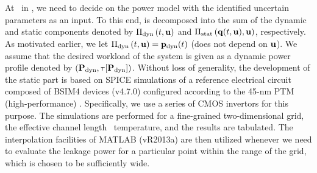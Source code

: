 At \ in , we need to decide on the power model with the identified uncertain parameters as an input.
To this end,  is decomposed into the sum of the dynamic and static components denoted by $\oPower{\dyn}{\t, \vU}$ and $\oPower{\stat}{\vTO(\t, \vU), \vU}$, respectively.
As motivated earlier, we let $\oPower{\dyn}{\t, \vU} = \vP_\dyn(\t)$ (does not depend on $\mathbf{u}$).
We assume that the desired workload of the system is given as a dynamic power profile denoted by $\profilePdyn$.
Without loss of generality, the development of the static part is based on SPICE simulations of a reference electrical circuit composed of BSIM4 devices (v4.7.0) \cite{bsim} configured according to the 45-nm PTM (high-performance) \cite{ptm}.
Specifically, we use a series of CMOS invertors for this purpose.
The simulations are performed for a fine-grained two-dimensional grid, the effective channel length \vs\ temperature, and the results are tabulated.
The interpolation facilities of MATLAB (vR2013a) \cite{matlab} are then utilized whenever we need to evaluate the leakage power for a particular point within the range of the grid, which is chosen to be sufficiently wide.
